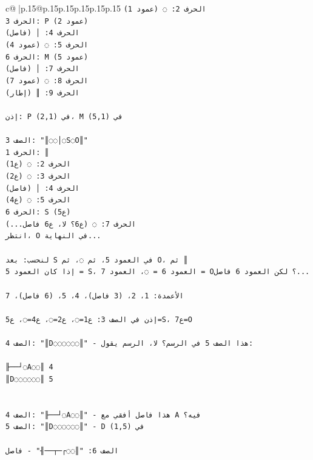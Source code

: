 \documentclass{article}
\begin{document}
{\begin{supertabular}{c@{$\;$}|p{.15\linewidth}@{}p{.15\linewidth}p{.15\linewidth}p{.15\linewidth}p{.15\linewidth}p{.15\linewidth}}
{{{\texttt{الحرف 2: ◌ (عمود 1)} \\
\texttt{الحرف 3: P (عمود 2)} \\
\texttt{الحرف 4: │ (فاصل)} \\
\texttt{الحرف 5: ◌ (عمود 4)} \\
\texttt{الحرف 6: M (عمود 5)} \\
\texttt{الحرف 7: │ (فاصل)} \\
\texttt{الحرف 8: ◌ (عمود 7)} \\
\texttt{الحرف 9: ║ (إطار)} \\
\\ 
\texttt{إذن: P في (2,1)، M في (5,1)} \\
\\ 
\texttt{الصف 3: "║◌◌│◌S◌O║"} \\
\texttt{الحرف 1: ║} \\
\texttt{الحرف 2: ◌ (ع1)} \\
\texttt{الحرف 3: ◌ (ع2)} \\
\texttt{الحرف 4: │ (فاصل)} \\
\texttt{الحرف 5: ◌ (ع4)} \\
\texttt{الحرف 6: S (ع5)} \\
\texttt{الحرف 7: ◌ (ع6؟ لا، ع6 فاصل...)} \\
\texttt{انتظر، O في النهاية...} \\
\\ 
\texttt{لنحسب: بعد S في العمود 5، ثم ◌، ثم O، ثم ║} \\
\texttt{إذا كان العمود 5 = S، العمود 6 = ◌، العمود 7 = O؟ لكن العمود 6 فاصل...} \\
\\ 
\texttt{الأعمدة: 1، 2، (3 فاصل)، 4، 5، (6 فاصل)، 7} \\
\\ 
\texttt{إذن في الصف 3: ع1=◌، ع2=◌، ع4=◌، ع5=S، ع7=O} \\
\\ 
\texttt{الصف 4: "║D◌◌◌◌◌◌║" {-} هذا الصف 5 في الرسم؟ لا، الرسم يقول:} \\
\\ 
\texttt{╟──┘◌A◌◌║ 4} \\
\texttt{║D◌◌◌◌◌◌║ 5} \\
\\ 
\\ 
\texttt{الصف 4: "╟──┘◌A◌◌║" {-} هذا فاصل أفقي مع A فيه؟} \\
\texttt{الصف 5: "║D◌◌◌◌◌◌║" {-} D في (1,5)} \\
\\ 
\texttt{الصف 6: "║◌◌┌─┬──╢" {-} فاصل} \\
}}}
\end{supertabular}}
\end{document}
